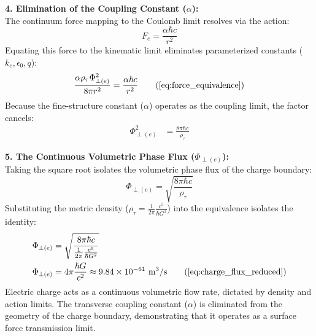 \textbf{4. Elimination of the Coupling Constant ($\alpha$):} \\
The continuum force mapping to the Coulomb limit resolves via the action:
\begin{equation}
    F_e = \frac{\alpha \hbar c}{r^2}
\end{equation}
Equating this force to the kinematic limit eliminates parameterized constants ($k_e, \epsilon_0, q$):
\begin{equation}
    \frac{\alpha \rho_{\tau} \Phi_{\perp(e)}^2}{8\pi r^2} = \frac{\alpha \hbar c}{r^2} \tag{\ref{eq:force_equivalence}}
\end{equation}
Because the fine-structure constant ($\alpha$) operates as the coupling limit, the factor cancels:
\begin{align}
    \Phi_{\perp(e)}^2 &= \frac{8\pi \hbar c}{\rho_{\tau}}
\end{align}

\textbf{5. The Continuous Volumetric Phase Flux ($\Phi_{\perp(e)}$):} \\
Taking the square root isolates the volumetric phase flux of the charge boundary:
\begin{equation}
    \Phi_{\perp(e)} = \sqrt{\frac{8\pi \hbar c}{\rho_{\tau}}} 
\end{equation}
Substituting the metric density ($\rho_{\tau} = \frac{1}{2\pi} \frac{c^5}{\hbar G^2}$) into the equivalence isolates the identity: 
\begin{align}
    \Phi_{\perp(e)} &= \sqrt{ \frac{8\pi \hbar c}{\frac{1}{2\pi} \frac{c^5}{\hbar G^2}} } \nonumber \\ 
    \Phi_{\perp(e)} &= 4\pi \frac{\hbar G}{c^2} \approx 9.84 \times 10^{-61} \text{ m}^3/\text{s} \tag{\ref{eq:charge_flux_reduced}} 
\end{align}
Electric charge acts as a continuous volumetric flow rate, dictated by density and action limits. The transverse coupling constant ($\alpha$) is eliminated from the geometry of the charge boundary, demonstrating that it operates as a surface force transmission limit.

\vspace{0.2 cm}

